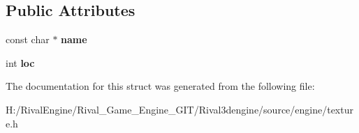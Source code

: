 \subsection*{Public Attributes}
\begin{DoxyCompactItemize}
\item 
\mbox{\label{struct_local_shader_param_acb99e1e0f1d3fabcf47d6eb3a9bf33ac}} 
const char $\ast$ {\bfseries name}
\item 
\mbox{\label{struct_local_shader_param_a5d3c48a2bab991e94a10ee3a81f84beb}} 
int {\bfseries loc}
\end{DoxyCompactItemize}


The documentation for this struct was generated from the following file\+:\begin{DoxyCompactItemize}
\item 
H\+:/\+Rival\+Engine/\+Rival\+\_\+\+Game\+\_\+\+Engine\+\_\+\+G\+I\+T/\+Rival3dengine/source/engine/texture.\+h\end{DoxyCompactItemize}
